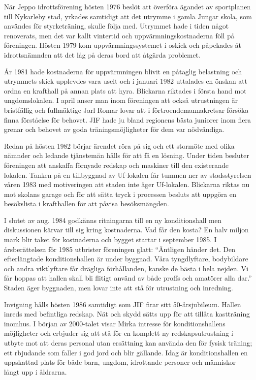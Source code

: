 
När Jeppo idrottsförening hösten 1976 beslöt att överföra ägandet av sportplanen till Nykarleby stad, yrkades samtidigt att det utrymme i gamla Jungar skola, som användes för styrketräning, skulle följa med. Utrymmet hade i tiden något renoverats, men det var kallt vintertid och uppvärmningskostnaderna föll på föreningen. Hösten 1979 kom uppvärmningssystemet i oskick och påpekades åt idrottsnämnden att det låg på deras bord att åtgärda problemet.

År 1981 hade kostnaderna för uppvärmningen blivit en påtaglig belastning och utrymmets skick upplevdes vara uselt och i januari 1982 uttalades en önskan att ordna en krafthall på annan plats att hyra. Blickarna riktades i första hand mot ungdomslokalen. I april anser man inom föreningen att också utrustningen är bristfällig och fullmäktige Jarl Romar lovar att i förtroendemannakretsar försöka finna förståelse för behovet. JIF hade ju bland regionens bästa juniorer inom flera grenar och behovet av goda träningsmöjligheter för dem var nödvändiga.

Redan på hösten 1982 börjar ärendet röra på sig och ett stormöte med olika nämnder och ledande tjänstemän hålls för att få en lösning. Under tiden besluter föreningen att anskaffa förnyade redskap och maskiner till den existerande lokalen. Tanken på en tillbyggnad av Uf-lokalen får tummen ner av stadsstyrelsen våren 1983 med motiveringen att staden inte äger Uf-lokalen. Blickarna riktas nu mot skolans garage och för att sätta tryck i processen besluts att uppgöra en besökslista i krafthallen för att påvisa besöksmängden.

I slutet av aug. 1984 godkänns ritningarna till en ny konditionshall men diskussionen kärvar till sig kring kostnaderna. Vad får den kosta? En halv miljon mark blir taket för kostnaderna och bygget startar i september 1985. I årsberättelsen för 1985 utbrister föreningen glatt: ``Äntligen händer det. Den efterlängtade konditionshallen är under byggnad. Våra tyngdlyftare, bodybildare och andra viktlyftare får drägliga förhållanden, kanske de bästa i hela nejden. Vi får hoppas att hallen skall bli flitigt använd av både proffs och amatörer alla dar.'' Staden äger byggnaden, men lovar inte att stå för utrustning och inredning.

Invigning hålls hösten 1986 samtidigt som JIF firar sitt 50-årsjubileum. Hallen inreds med befintliga redskap. Nät och skydd sätts upp för att tillåta kastträning inomhus. I början av 2000-talet visar Mirka intresse för konditionshallens möjligheter och erbjuder sig att stå för en komplett ny redskapsutrustning i utbyte mot att deras personal utan ersättning kan använda den för fysisk träning; ett rbjudande som faller i god jord och blir gällande. Idag är konditionshallen en uppskattad plats för både barn, ungdom, idrottande personer och människor långt upp i åldrarna.



